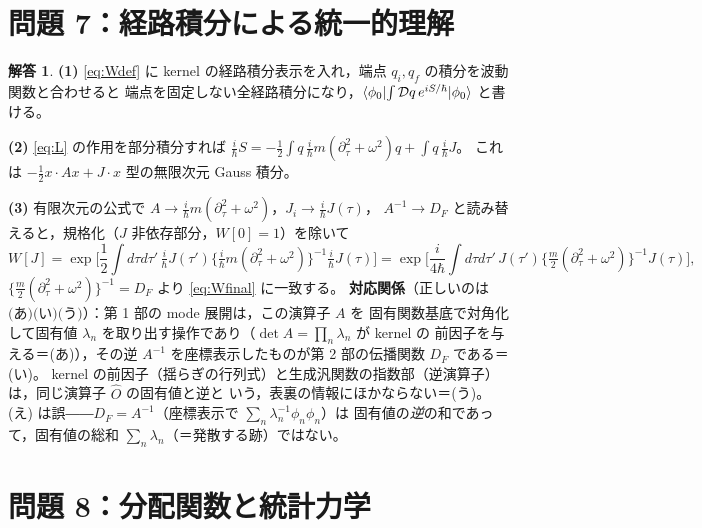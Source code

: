 \documentclass[dvipdfmx, uplatex]{jsarticle}
\theoremstyle{definition}
\newtheorem*{sol}{解答}
\begin{document}
\section{問題 7：経路積分による統一的理解}

\begin{sol}
\textbf{(1)} \eqref{eq:Wdef} に kernel の経路積分表示を入れ，端点 $q_i,q_f$ の積分を波動関数と合わせると
端点を固定しない全経路積分になり，$\bra{\phi_0}\!\int\mathcal{D}q\,e^{iS/\hbar}\!\ket{\phi_0}$ と書ける。

\par\smallskip
\textbf{(2)} \eqref{eq:L} の作用を部分積分すれば
$\frac{i}{\hbar}S=-\frac12\int q\,\frac{i}{\hbar}m(\partial_\tau^2+\omega^2)q+\int q\,\frac{i}{\hbar}J$。
これは $-\frac12 x\!\cdot\!Ax+J\!\cdot\!x$ 型の無限次元 Gauss 積分。

\par\smallskip
\textbf{(3)} 有限次元の公式で $A\to\frac{i}{\hbar}m(\partial_\tau^2+\omega^2)$，$J_i\to\frac{i}{\hbar}J(\tau)$，
$A^{-1}\to D_F$ と読み替えると，規格化（$J$ 非依存部分，$W[0]=1$）を除いて
\[
    W[J]=\exp\!\Big[\frac12\!\int d\tau d\tau'\,\tfrac{i}{\hbar}J(\tau')
    \big\{\tfrac{i}{\hbar}m(\partial_\tau^2+\omega^2)\big\}^{-1}\tfrac{i}{\hbar}J(\tau)\Big]
    =\exp\!\Big[\frac{i}{4\hbar}\!\int d\tau d\tau'\,J(\tau')\big\{\tfrac{m}{2}(\partial_\tau^2+\omega^2)\big\}^{-1}J(\tau)\Big],
\]
$\big\{\frac{m}{2}(\partial_\tau^2+\omega^2)\big\}^{-1}=D_F$ より \eqref{eq:Wfinal} に一致する。
\textbf{対応関係}（正しいのは $\boxed{\text{(あ)(い)(う)}}$）：第 1 部の mode 展開は，この演算子 $A$ を
固有関数基底で対角化して固有値 $\lambda_n$ を取り出す操作であり（$\det A=\prod_n\lambda_n$ が kernel の
前因子を与える＝(あ)），その逆 $A^{-1}$ を座標表示したものが第 2 部の伝播関数 $D_F$ である＝(い)。
kernel の前因子（揺らぎの行列式）と生成汎関数の指数部（逆演算子）は，同じ演算子 $\hat O$ の固有値と逆と
いう，表裏の情報にほかならない＝(う)。(え) は誤――$D_F=A^{-1}$（座標表示で $\sum_n\lambda_n^{-1}\phi_n\phi_n$）は
固有値の\emph{逆}の和であって，固有値の総和 $\sum_n\lambda_n$（＝発散する跡）ではない。
\end{sol}

\section{問題 8：分配関数と統計力学}
\end{document}
